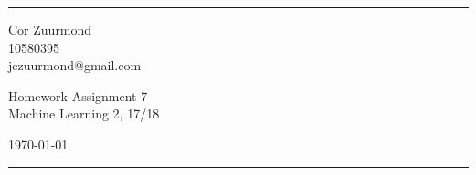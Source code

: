 \documentclass[a4paper]{article}
\begin{document}

\fancyhead[C]{}
\hrule \medskip %
\begin{minipage}{0.295\textwidth}
    \raggedright
    \footnotesize
    Cor Zuurmond \hfill\\
    10580395 \hfill\\
    jczuurmond@gmail.com
\end{minipage}
\begin{minipage}{0.4\textwidth}
    \centering
    \large
    Homework Assignment 7\\
    \normalsize
    Machine Learning 2, 17/18\\
\end{minipage}
\begin{minipage}{0.295\textwidth}
    \raggedleft
    \today\hfill\\
\end{minipage}
\medskip\hrule
\bigskip

\end{document}

